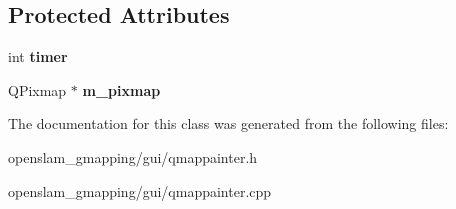 \subsection*{Protected Attributes}
\begin{DoxyCompactItemize}
\item 
\mbox{\label{classQMapPainter_aa336ae3965c716a4728081fef9dba2e6}} 
int {\bfseries timer}
\item 
\mbox{\label{classQMapPainter_aecf732026dd1058935f50eccf5e90b80}} 
Q\+Pixmap $\ast$ {\bfseries m\+\_\+pixmap}
\end{DoxyCompactItemize}


The documentation for this class was generated from the following files\+:\begin{DoxyCompactItemize}
\item 
openslam\+\_\+gmapping/gui/qmappainter.\+h\item 
openslam\+\_\+gmapping/gui/qmappainter.\+cpp\end{DoxyCompactItemize}
